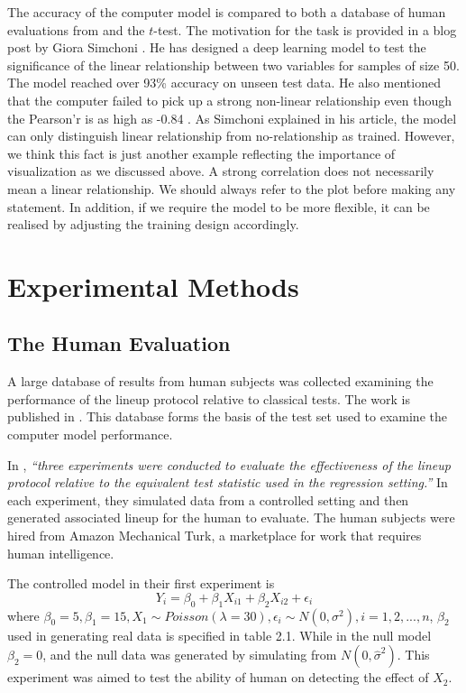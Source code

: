 \documentclass[12pt]{article}
\begin{document}
The accuracy of the computer model is compared to both a database of
human evaluations from \citet{MM13} and the \(t\)-test. The motivation
for the task is provided in a blog post by Giora Simchoni \citep{SIM18}.
He has designed a deep learning model to test the significance of the
linear relationship between two variables for samples of size 50. The
model reached over 93\% accuracy on unseen test data. He also mentioned
that the computer failed to pick up a strong non-linear relationship
even though the Pearson'r is as high as -0.84 \citep{SIM18}. As Simchoni
explained in his article, the model can only distinguish linear
relationship from no-relationship as trained. However, we think this
fact is just another example reflecting the importance of visualization
as we discussed above. A strong correlation does not necessarily mean a
linear relationship. We should always refer to the plot before making
any statement. In addition, if we require the model to be more flexible,
it can be realised by adjusting the training design accordingly.

\section{Experimental Methods}\label{experimental-methods}

\subsection{The Human Evaluation}\label{the-human-evaluation}

A large database of results from human subjects was collected examining
the performance of the lineup protocol relative to classical tests. The
work is published in \citet{MM13}. This database forms the basis of the
test set used to examine the computer model performance.

In \citet{MM13}, \emph{``three experiments were conducted to evaluate
the effectiveness of the lineup protocol relative to the equivalent test
statistic used in the regression setting.''} In each experiment, they
simulated data from a controlled setting and then generated associated
lineup for the human to evaluate. The human subjects were hired from
Amazon Mechanical Turk, a marketplace for work that requires human
intelligence. \citep{amazon}

The controlled model in their first experiment is
\[Y_i=\beta_0+\beta_1 X_{i1}+\beta_2 X_{i2}+\epsilon_i\] where
\(\beta_0=5, \beta_1=15, X_1 \sim Poisson(\lambda=30), \epsilon_i\sim N(0,\sigma^2), i=1,2,...,n\),
\(\beta_2\) used in generating real data is specified in table 2.1.
While in the null model \(\beta_2=0\), and the null data was generated
by simulating from \(N(0,\hat{\sigma}^2)\). This experiment was aimed to
test the ability of human on detecting the effect of \(X_2\).
\end{document}
